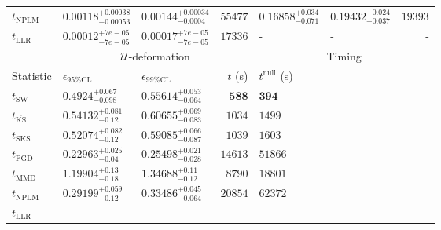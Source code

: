 \begin{tabular}{l|llr|llr}
\rowcolor{red!35}	$t_{\mathrm{NPLM}}$ & $0.00118_{-0.00053}^{+0.00038}$ & $0.00144_{-0.0004}^{+0.00034}$ & $55477$ & $0.16858_{-0.071}^{+0.034}$ & $0.19432_{-0.037}^{+0.024}$ & $19393$ \\
	$t_{\mathrm{LLR}}$ & $0.00012_{-7e-05}^{+7e-05}$ & $0.00017_{-7e-05}^{+7e-05}$ & $17336$ & - & - & - \\
	\toprule
	\multicolumn{1}{c}{} & \multicolumn{3}{c}{$\mathcal{U}$-deformation} & \multicolumn{3}{c}{Timing} \\
	Statistic & $\epsilon_{95\%\mathrm{CL}}$ & $\epsilon_{99\%\mathrm{CL}}$ & $t$ (s) & $t^{\mathrm{null}}$ (s) \\
	\midrule
	$t_{\mathrm{SW}}$ & $0.4924_{-0.098}^{+0.067}$ & $0.55614_{-0.064}^{+0.053}$ & ${\mathbf{588}}$ & ${\mathbf{394}}$ \\
	$t_{\overline{\mathrm{KS}}}$ & $0.54132_{-0.12}^{+0.081}$ & $0.60655_{-0.083}^{+0.069}$ & $1034$ & $1499$ \\
	$t_{\mathrm{SKS}}$ & $0.52074_{-0.12}^{+0.082}$ & $0.59085_{-0.087}^{+0.066}$ & $1039$ & $1603$ \\
	$t_{\mathrm{FGD}}$ & ${\mathbf{0.22963_{-0.04}^{+0.025}}}$ & ${\mathbf{0.25498_{-0.028}^{+0.021}}}$ & $14613$ & $51866$ \\
	$t_{\mathrm{MMD}}$ & $1.19904_{-0.18}^{+0.13}$ & $1.34688_{-0.12}^{+0.11}$ & $8790$ & $18801$ \\
\rowcolor{red!35}	$t_{\mathrm{NPLM}}$ & $0.29199_{-0.12}^{+0.059}$ & $0.33486_{-0.064}^{+0.045}$ & $20854$ & $62372$ \\
	$t_{\mathrm{LLR}}$ & - & - & - & - \\
	\bottomrule
\end{tabular}
